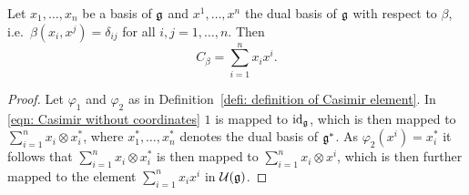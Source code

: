 \begin{lem}
 Let $x_1, \dotsc, x_n$ be a basis of $\mathfrak{g}$ and $x^1, \dotsc, x^n$ the dual basis of $\mathfrak{g}$ with respect to $\beta$, i.e.\ $\beta(x_i, x^j) = \delta_{ij}$ for all $i,j = 1, \dotsc, n$. Then
 \[
  C_\beta = \sum_{i=1}^n x_i x^i.
 \]
\end{lem}
\begin{proof}
 Let $\varphi_1$ and $\varphi_2$ as in Definition~\ref{defi: definition of Casimir element}. In \eqref{eqn: Casimir without coordinates} $1$ is mapped to $\operatorname{id}_{\mathfrak{g}}$, which is then mapped to $\sum_{i=1}^n x_i \otimes x_i^*$, where $x_1^*, \dotsc, x_n^*$ denotes the dual basis of $\mathfrak{g}^*$. As $\varphi_2(x^i) = x_i^*$ it follows that $\sum_{i=1}^n x_i \otimes x_i^*$ is then mapped to $\sum_{i=1}^n x_i \otimes x^i$, which is then further mapped to the element $\sum_{i=1}^n x_i x^i$ in $\mathcal{U}(\mathfrak{g})$.
\end{proof}















